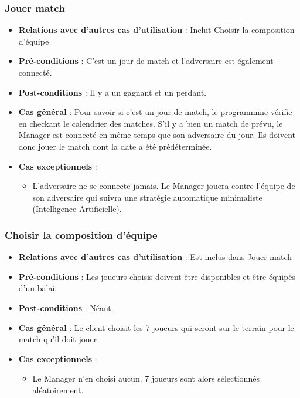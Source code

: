 \documentclass[a4paper,titlepage]{scrreprt}
\begin{document}
    \subsubsection{Jouer match}
      \begin{itemize}
        \item \textbf{Relations avec d'autres cas d'utilisation}  : Inclut Choisir la composition d’équipe
        \item \textbf{Pré-conditions} : C’est un jour de match et l’adversaire est également connecté.
        \item \textbf{Post-conditions} : Il y a un gagnant et un perdant.
        \item \textbf{Cas général} : Pour savoir si c'est un jour de match, le programmme vérifie en checkant le \gls{calendrier}  des matches. S'il y a bien un match de prévu, le Manager est connecté en même temps que son adversaire du jour. Ils doivent donc jouer le match dont la date a été prédéterminée.
        \item \textbf{Cas exceptionnels} : 
          \begin{itemize}
            \item L’adversaire ne se connecte jamais. Le Manager jouera contre l’équipe de son adversaire qui suivra une stratégie automatique minimaliste (Intelligence Artificielle).
          \end{itemize}
      \end{itemize}
    \subsubsection{Choisir la composition d'équipe}
      \begin{itemize}
        \item \textbf{Relations avec d'autres cas d'utilisation}  : Est inclus dans Jouer match
        \item \textbf{Pré-conditions} : Les joueurs choisis doivent être disponibles et être équipés d’un balai.
        \item \textbf{Post-conditions} : Néant.
        \item \textbf{Cas général} : Le client choisit les 7 joueurs qui seront sur le terrain pour le match qu’il doit jouer.
        \item \textbf{Cas exceptionnels} : 
        \begin{itemize}
            \item Le Manager n'en choisi aucun. 7 joueurs sont alors sélectionnés aléatoirement.
          \end{itemize}
      \end{itemize}
\end{document}
